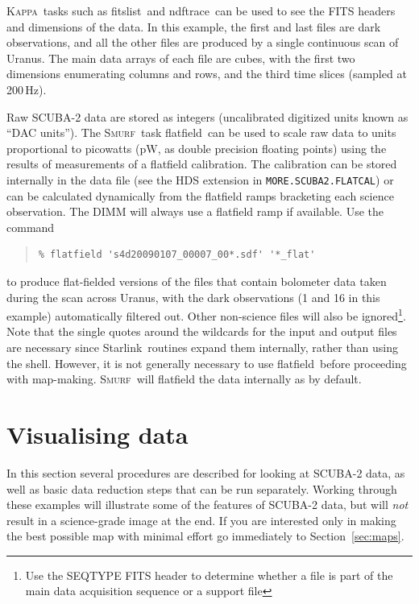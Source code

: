 \documentclass[twoside,11pt]{article}
\newcommand{\htmladdnormallink}[2]{#1}
\newcommand{\xref}[3]{#1}
\newcommand{\xlabel}[1]{}
\renewcommand{\_}{\texttt{\symbol{95}}}
\newenvironment{myquote}{\begin{quote}\begin{small}}{\end{small}\end{quote}}
\newcommand{\starlink}{\htmladdnormallink{Starlink}{http://starlink.jach.hawaii.edu}}
\newcommand{\Kappa}{\xref{\textsc{Kappa}}{sun95}{}}
\newcommand{\smurf}{\xref{\textsc{Smurf}}{sun258}{}}
\newcommand{\task}[1]{\textsf{#1}}
\newcommand{\flatfield}{\xref{\task{flatfield}}{sun258}{FLATFIELD}}
\newcommand{\fitslist}{\xref{\task{fitslist}}{sun95}{FITSLIST}}
\newcommand{\ndftrace}{\xref{\task{ndftrace}}{sun95}{NDFTRACE}}
\begin{document}
\Kappa\ tasks such as \fitslist\ and \ndftrace\ can be used to see the
FITS headers and dimensions of the data. In this example, the first
and last files are dark observations, and all the other files are
produced by a single continuous scan of Uranus. The main data arrays
of each file are cubes, with the first two dimensions enumerating
columns and rows, and the third time slices (sampled at 200\,Hz).

Raw SCUBA-2 data are stored as integers (uncalibrated digitized units
known as ``DAC units''). The \smurf\ task \flatfield\ can be used to
scale raw data to units proportional to picowatts (pW, as double
precision floating points) using the results of measurements of a
flatfield calibration. The calibration can be stored internally in the
data file (see the HDS extension in \texttt{MORE.SCUBA2.FLATCAL}) or can be
calculated dynamically from the flatfield ramps bracketing each
science observation. The DIMM will always use a flatfield ramp if
available. Use the command

\begin{myquote}
\begin{verbatim}
% flatfield 's4d20090107_00007_00*.sdf' '*_flat'
\end{verbatim}
\end{myquote}
%
to produce flat-fielded versions of the files that contain bolometer
data taken during the scan across Uranus, with the dark observations
(1 and 16 in this example) automatically filtered out. Other
non-science files will also be ignored\footnote{Use the SEQ\_TYPE FITS
  header to determine whether a file is part of the main data
  acquisition sequence or a support file}. Note that the single quotes
around the wildcards for the input and output files are necessary
since \starlink\ routines expand them internally, rather than using
the shell. However, it is not generally necessary to use \flatfield\
before proceeding with map-making. \smurf\ will flatfield the data
internally as by default.

\section{\xlabel{time_series}Visualising data}
\label{sec:visual}

In this section several procedures are described for looking at
SCUBA-2 data, as well as basic data reduction steps that can be run
separately. Working through these examples will illustrate some of the
features of SCUBA-2 data, but will {\em not} result in a science-grade
image at the end. If you are interested only in making the best
possible map with minimal effort go immediately to
Section~\ref{sec:maps}.
\end{document}
